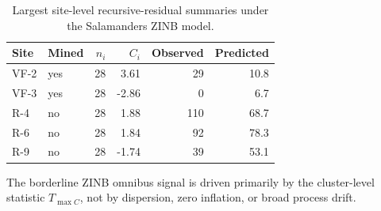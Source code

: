 \begin{table}[H]
\centering
\small
\caption{Largest site-level recursive-residual summaries under the Salamanders ZINB model.}
\label{tab:empirical-salamanders-zinb-clusters}
\begin{tabular}{llrrrr}
\toprule
Site & Mined & $n_i$ & $C_i$ & Observed & Predicted \\
\midrule
VF-2 & yes & 28 & 3.61 & 29 & 10.8 \\
VF-3 & yes & 28 & -2.86 & 0 & 6.7 \\
R-4 & no & 28 & 1.88 & 110 & 68.7 \\
R-6 & no & 28 & 1.84 & 92 & 78.3 \\
R-9 & no & 28 & -1.74 & 39 & 53.1 \\
\bottomrule
\end{tabular}
\par\vspace{0.5ex}\footnotesize{The borderline ZINB omnibus signal is driven primarily by the cluster-level statistic $T_{\max C}$, not by dispersion, zero inflation, or broad process drift.}
\end{table}
